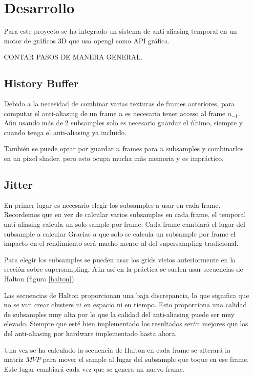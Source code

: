 \documentclass[withindex, glossary]{cam-thesis}
\begin{document}
\chapter{Desarrollo}

Para este proyecto se ha integrado un sistema de anti-aliasing temporal en un motor de gráficos 3D que usa \Gls{opengl} como API gráfica.

CONTAR PASOS DE MANERA GENERAL.

\section{History Buffer}

Debido a la necesidad de combinar varias texturas de frames anteriores, para computar el anti-aliasing de un frame $n$ es necesario tener acceso al frame $n_{-1}$. Aún usando más de 2 subsamples solo es necesario guardar el último, siempre y cuando tenga el anti-aliasing ya incluido.

También se puede optar por guardar $n$ frames para $n$ subsamples y combinarlos en un pixel shader, pero esto ocupa mucha más memoria y es impráctico.

\section{Jitter}

En primer lugar es necesario elegir los subsamples a usar en cada frame. Recordemos que en vez de calcular varios subsamples en cada frame, el temporal anti-aliasing calcula un solo sample por frame. Cada frame cambiará el lugar del subsample a calcular Gracias a que solo se calcula un subsample por frame el impacto en el rendimiento será mucho menor al del supersampling tradicional.

Para elegir los subsamples se pueden usar los grids vistos anteriormente en la sección sobre supersampling\cite{unrealtaa}. Aún así en la práctica se suelen usar secuencias de Halton (figura \ref{halton}).

Las secuencias de Halton proporcionan una baja discrepancia, lo que significa que no se van crear clusters ni en espacio ni en tiempo. Esto proporciona una calidad de subsamples muy alta por lo que la calidad del anti-aliasing puede ser muy elevado. Siempre que esté bien implementado los resultados serán mejores que los del anti-aliasing por hardware implementado hasta ahora\cite{unrealtaa}.

Una vez se ha calculado la secuencia de Halton en cada frame se alterará la matriz $MVP$ para mover el sample al lugar del subsample que toque en ese frame. Este lugar cambiará cada vez que se genera un nuevo frame.
\end{document}
